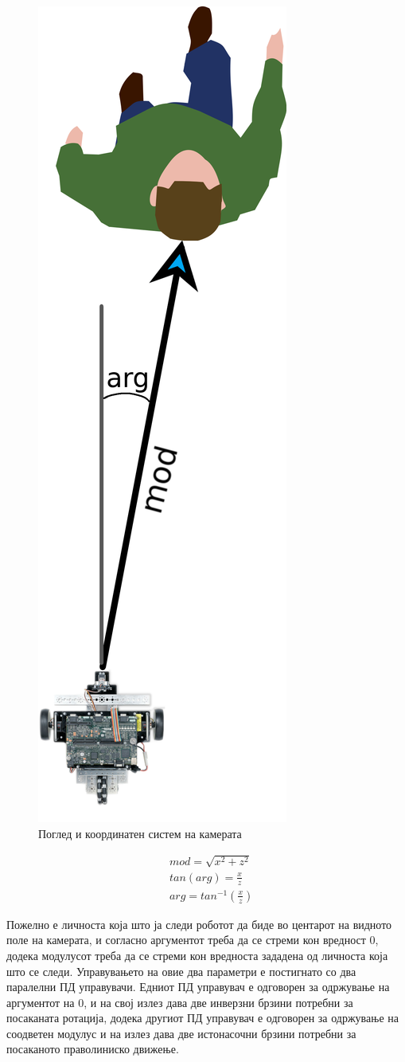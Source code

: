 \documentclass[11pt]{article}
\begin{document}
            \begin{figure}[H]
              \includegraphics[width=0.25\linewidth]{./images/kinectView.png}
              \centering
              \caption{Поглед и координатен систем на камерата}
              \label{fig:kinectView.png}
              \end{figure}

      \begin{align} \label{eq:cart2pol}
    	   & mod = \sqrt{x^{2} + z^{2}} \nonumber \\
         & tan(arg) = \frac{x}{z} \nonumber\\
         & arg = tan^{-1}(\frac{x}{z})
      \end{align}

      Пожелно е личноста која што ја следи роботот да биде во центарот на видното поле на камерата, и согласно аргументот треба да се стреми кон вредност 0, додека модулусот треба да се стреми кон вредноста зададена од личноста која што се следи. Управувањето на овие два параметри е постигнато со два паралелни ПД управувачи. Едниот ПД управувач е одговорен за одржување на аргументот на 0, и на свој излез дава две инверзни брзини потребни за посаканата ротација, додека другиот ПД управувач е одговорен за одржување на соодветен модулус и на излез дава две истонасочни брзини потребни за посаканото праволиниско движење.
\end{document}

